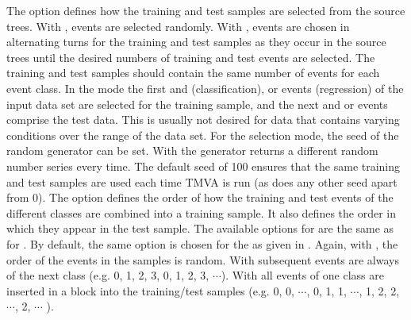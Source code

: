 The option  defines how the training and test samples
are selected from the source trees. With ,
events are selected randomly. With , events
are chosen in alternating turns for the training and test samples as
they occur in the source trees until the desired numbers of training
and test events are selected. The training and test samples should 
contain the same number of events for each event class.
In the  mode the
first  and 
(classification), or  events (regression) of
the input data set are selected for the training sample, and the next
 and  or
 events comprise the test data. This is usually
not desired for data that contains varying conditions over the range
of the data set. For the  selection mode, the seed of the
random generator can be set. With  the generator
returns a different random number series every time.  The default seed
of 100 ensures that the same training and test samples are used each time 
TMVA is
run (as does any other seed apart from 0). The option 
defines the order of how the training and test events of the different classes
are combined into a training sample. It also defines the order in which they appear in the test sample. The available options for
 are the same as for . By default, the same
option is chosen for the  as given in . Again, 
with , the order of the events in the samples is random.
With  subsequent events are always of the next class
(e.g. 0, 1, 2, 3, 0, 1, 2, 3, $\cdots$). With  all events
of one class are inserted in a block into the training/test samples (e.g. 
0, 0, $\cdots$, 0, 1, 1, $\cdots$, 1, 2, 2, $\cdots$, 2, $\cdots$ ).

